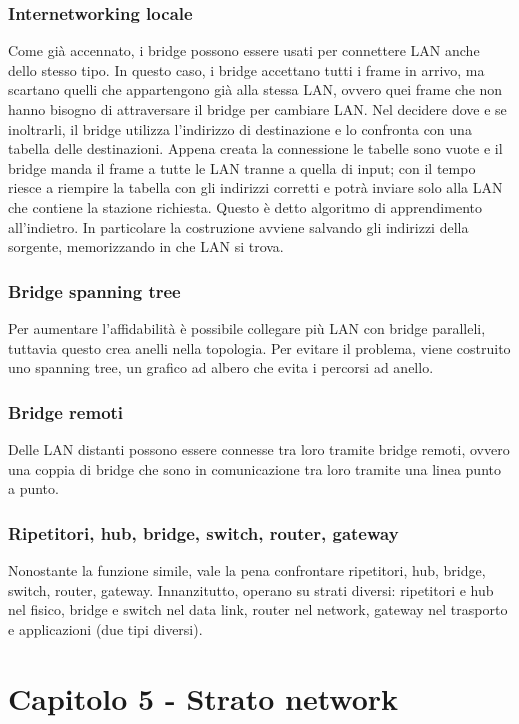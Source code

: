 \subsubsection{Internetworking locale}
Come già accennato, i bridge possono essere usati per connettere LAN anche dello stesso tipo.
In questo caso, i bridge accettano tutti i frame in arrivo, ma scartano quelli che appartengono già alla stessa LAN,
ovvero quei frame che non hanno bisogno di attraversare il bridge per cambiare LAN.
Nel decidere dove e se inoltrarli, il bridge utilizza l'indirizzo di destinazione e lo confronta con una tabella delle destinazioni.
Appena creata la connessione le tabelle sono vuote e il bridge manda il frame a tutte le LAN tranne a quella di input;
con il tempo riesce a riempire la tabella con gli indirizzi corretti e potrà inviare solo alla LAN che contiene la stazione richiesta.
Questo è detto algoritmo di apprendimento all'indietro.
In particolare la costruzione avviene salvando gli indirizzi della sorgente, memorizzando in che LAN si trova.

\subsubsection{Bridge spanning tree}
Per aumentare l'affidabilità è possibile collegare più LAN con bridge paralleli, tuttavia questo crea anelli nella topologia.
Per evitare il problema, viene costruito uno spanning tree, un grafico ad albero che evita i percorsi ad anello.

\subsubsection{Bridge remoti}
Delle LAN distanti possono essere connesse tra loro tramite bridge remoti,
ovvero una coppia di bridge che sono in comunicazione tra loro tramite una linea punto a punto.

\subsubsection{Ripetitori, hub, bridge, switch, router, gateway}
Nonostante la funzione simile, vale la pena confrontare ripetitori, hub, bridge, switch, router, gateway.
Innanzitutto, operano su strati diversi:
ripetitori e hub nel fisico, bridge e switch nel data link, router nel network, gateway nel trasporto e applicazioni (due tipi diversi).

\newpage
\section{Capitolo 5 - Strato network}

